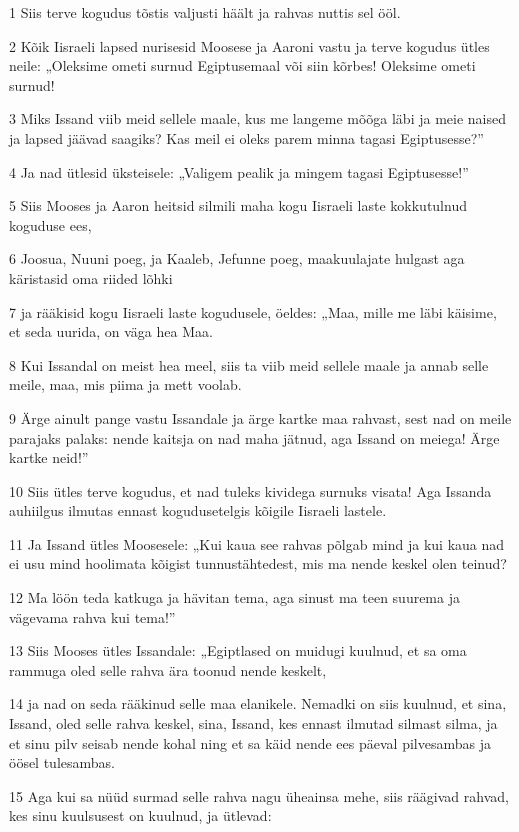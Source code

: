 \par 1 Siis terve kogudus tõstis valjusti häält ja rahvas nuttis sel ööl.
\par 2 Kõik Iisraeli lapsed nurisesid Moosese ja Aaroni vastu ja terve kogudus ütles neile: „Oleksime ometi surnud Egiptusemaal või siin kõrbes! Oleksime ometi surnud!
\par 3 Miks Issand viib meid sellele maale, kus me langeme mõõga läbi ja meie naised ja lapsed jäävad saagiks? Kas meil ei oleks parem minna tagasi Egiptusesse?”
\par 4 Ja nad ütlesid üksteisele: „Valigem pealik ja mingem tagasi Egiptusesse!”
\par 5 Siis Mooses ja Aaron heitsid silmili maha kogu Iisraeli laste kokkutulnud koguduse ees,
\par 6 Joosua, Nuuni poeg, ja Kaaleb, Jefunne poeg, maakuulajate hulgast aga käristasid oma riided lõhki
\par 7 ja rääkisid kogu Iisraeli laste kogudusele, öeldes: „Maa, mille me läbi käisime, et seda uurida, on väga hea Maa.
\par 8 Kui Issandal on meist hea meel, siis ta viib meid sellele maale ja annab selle meile, maa, mis piima ja mett voolab.
\par 9 Ärge ainult pange vastu Issandale ja ärge kartke maa rahvast, sest nad on meile parajaks palaks: nende kaitsja on nad maha jätnud, aga Issand on meiega! Ärge kartke neid!”
\par 10 Siis ütles terve kogudus, et nad tuleks kividega surnuks visata! Aga Issanda auhiilgus ilmutas ennast kogudusetelgis kõigile Iisraeli lastele.
\par 11 Ja Issand ütles Moosesele: „Kui kaua see rahvas põlgab mind ja kui kaua nad ei usu mind hoolimata kõigist tunnustähtedest, mis ma nende keskel olen teinud?
\par 12 Ma löön teda katkuga ja hävitan tema, aga sinust ma teen suurema ja vägevama rahva kui tema!”
\par 13 Siis Mooses ütles Issandale: „Egiptlased on muidugi kuulnud, et sa oma rammuga oled selle rahva ära toonud nende keskelt,
\par 14 ja nad on seda rääkinud selle maa elanikele. Nemadki on siis kuulnud, et sina, Issand, oled selle rahva keskel, sina, Issand, kes ennast ilmutad silmast silma, ja et sinu pilv seisab nende kohal ning et sa käid nende ees päeval pilvesambas ja öösel tulesambas.
\par 15 Aga kui sa nüüd surmad selle rahva nagu üheainsa mehe, siis räägivad rahvad, kes sinu kuulsusest on kuulnud, ja ütlevad:
